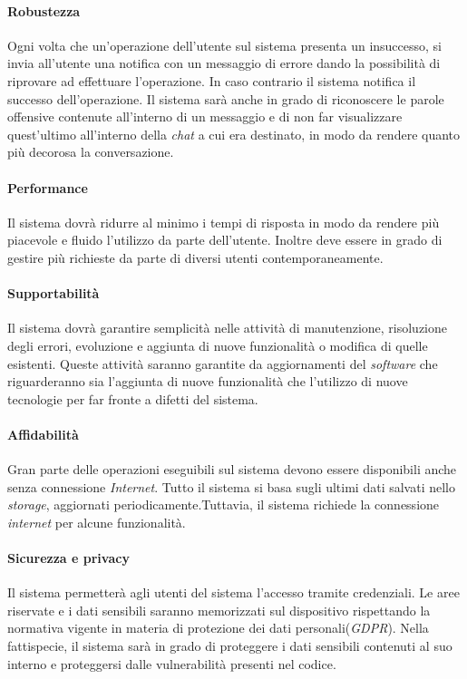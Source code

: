 \paragraph{Robustezza\\} 
Ogni volta che un’operazione dell’utente sul sistema presenta un insuccesso, si invia all’utente una notifica con un messaggio di errore dando la possibilità di riprovare ad effettuare l’operazione. In caso contrario il sistema notifica il successo dell’operazione. 
Il sistema sarà anche in grado di riconoscere le parole offensive contenute all’interno di un messaggio e di non far visualizzare quest’ultimo all’interno della \emph{chat} a cui era destinato, in modo da rendere quanto più decorosa la conversazione. 

\paragraph{Performance\\} 
Il sistema dovrà ridurre al minimo i tempi di risposta in modo da rendere più piacevole e fluido l’utilizzo da parte dell’utente. Inoltre deve essere in grado di gestire più richieste da parte di diversi utenti contemporaneamente.

\paragraph{Supportabilità\\} 
Il sistema dovrà garantire semplicità nelle attività di manutenzione, risoluzione degli errori, evoluzione e aggiunta di nuove funzionalità o modifica di quelle esistenti.
Queste attività saranno garantite da aggiornamenti del \emph{software} che riguarderanno sia l’aggiunta di nuove funzionalità che l'utilizzo di nuove tecnologie per far fronte a difetti del sistema.

\paragraph{Affidabilità\\} 
Gran parte delle operazioni eseguibili sul sistema devono essere disponibili anche senza connessione \emph{Internet}. Tutto il sistema si basa sugli ultimi dati salvati nello \textit{storage}, aggiornati periodicamente.Tuttavia, il sistema richiede la connessione \emph{internet} per alcune funzionalità.

\paragraph{Sicurezza e privacy\\} 
Il sistema permetterà agli utenti del sistema l’accesso tramite credenziali. Le aree riservate e i dati sensibili saranno memorizzati sul dispositivo rispettando la normativa vigente in materia di protezione dei dati personali(\textit{GDPR}). Nella fattispecie, il sistema sarà in grado di proteggere i dati sensibili contenuti al suo interno e proteggersi dalle vulnerabilità presenti nel codice.

